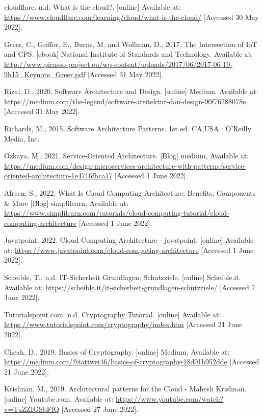 \documentclass[12pt,a4paper]{article}
\begin{document}
{\begin{thebibliography}{}
cloudflare. n.d. What is the cloud?. [online] Available at: \url{https://www.cloudflare.com/learning/cloud/what-is-the-cloud/} [Accessed 30 May 2022].

Greer, C., Griffor, E., Burns, M. and Wollman, D., 2017. The Intersection of IoT and CPS. [ebook] National Institute of Standards and Technology. Available at: \url{http://www.picasso-project.eu/wp-content/uploads/2017/06/2017-06-19-9h15_Keynote_Greer.pdf} [Accessed 31 May 2022].

Rizal, D., 2020. Software Architecture and Design. [online] Medium. Available at: \url{https://medium.com/the-legend/software-arsitektur-dan-design-90f76288078e} [Accessed 31 May 2022].

Richards, M., 2015. Software Architecture Patterns. 1st ed. CA,USA : O'Reilly Media, Inc.

Ozkaya, M., 2021. Service-Oriented Architecture. [Blog] medium, Available at: \url{https://medium.com/design-microservices-architecture-with-patterns/service-oriented-architecture-1e4716fbca17} [Accessed 1 June 2022].

Afreen, S., 2022. What Is Cloud Computing Architecture: Benefits, Components \& More [Blog] simplilearn, Available at: \url{https://www.simplilearn.com/tutorials/cloud-computing-tutorial/cloud-computing-architecture} [Accessed 1 June 2022].

Javatpoint. 2022. Cloud Computing Architecture - javatpoint. [online] Available at: \url{https://www.javatpoint.com/cloud-computing-architecture} [Accessed 1 June 2022].

Scheible, T., n.d. IT-Sicherheit Grundlagen: Schutzziele. [online] Scheible.it. Available at: \url{https://scheible.it/it-sicherheit-grundlagen-schutzziele/} [Accessed 7 June 2022].

Tutorialspoint.com. n.d. Cryptography Tutorial. [online] Available at: \url{https://www.tutorialspoint.com/cryptography/index.htm} [Accessed 21 June 2022].

Cheah, D., 2019. Basics of Cryptography. [online] Medium. Available at: \url{https://medium.com/@tattwei46/basics-of-cryptography-18d01b952dde} [Accessed 21 June 2022].

Krishnan, M., 2019. Architectural patterns for the Cloud - Mahesh Krishnan. [online] Youtube.com. Available at: \url{https://www.youtube.com/watch?v=TuZZIGSbFfQ} [Accessed 27 June 2022].


\end{thebibliography}}
\end{document}
